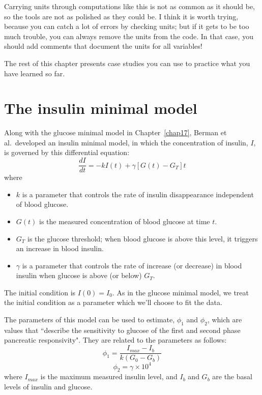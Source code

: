 \documentclass[12pt]{book}
\theoremstyle{exercise}
\begin{document}
Carrying units through computations like this is not as common as it should be, so the tools are not as polished as they could be.  I think it is worth trying, because you can catch a lot of errors by checking units; but if it gets to be too much trouble, you can always remove the units from the code.  In that case, you should add comments that document the units for all variables!

The rest of this chapter presents case studies you can use to practice what you have learned so far.


\section{The insulin minimal model}

Along with the glucose minimal model in Chapter~\ref{chap17}, Berman et al.~developed an insulin minimal model, in which the concentration of insulin, $I$, is governed by this differential equation:
%
\[ \frac{dI}{dt} = -k I(t) + \gamma \left[ G(t) - G_T \right] t \]
%
where

\begin{itemize}

\item $k$ is a parameter that controls the rate of insulin disappearance independent of blood glucose.   

\item $G(t)$ is the measured concentration of blood glucose at time $t$.

\item $G_T$ is the glucose threshold; when blood glucose is above this level, it triggers an increase in blood insulin. 

\item $\gamma$ is a parameter that controls the rate of increase (or decrease) in blood insulin when glucose is above (or below) $G_T$.


\end{itemize}

The initial condition is $I(0) = I_0$.  As in the glucose minimal model, we treat the initial condition as a parameter which we'll choose to fit the data.


The parameters of this model can be used to estimate, $\phi_1$ and $\phi_2$, which are values that ``describe the sensitivity to glucose of the first and second phase pancreatic responsivity".  They are related to the parameters as follows:
%
\[ \phi_1 = \frac{I_{max} - I_b}{k (G_0 - G_b)}\]
%
\[ \phi_2 = \gamma \times 10^4 \]
%
where $I_{max}$ is the maximum measured insulin level, and $I_b$ and $G_b$ are the basal levels of insulin and glucose.
\end{document}
